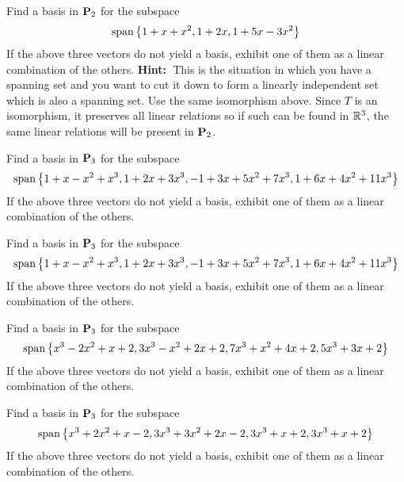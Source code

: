 \begin{ex}
  Find a basis in $\mathbf{P}_{2}$ for the subspace
  \begin{equation*}
    \sspan\set{1+x+x^{2},1+2x,1+5x-3x^{2}}
  \end{equation*}
  If the above three vectors do not yield a basis, exhibit one of them
  as a linear combination of the others. \textbf{Hint:\ }This is the
  situation in which you have a spanning set and you want to cut it
  down to form a linearly independent set which is also a spanning
  set. Use the same isomorphism above. Since $T$ is an isomorphism, it
  preserves all linear relations so if such can be found in $\mathbb{R}^{3}$,
  the same linear relations will be present in $\mathbf{P}_{2}$.
\end{ex}

\begin{ex}
  Find a basis in $\mathbf{P}_{3}$ for the subspace
  \begin{equation*}
    \sspan\set{
      1+x-x^{2}+x^{3},1+2x+3x^{3},-1+3x+5x^{2}+7x^{3},1+6x+4x^{2}+11x^{3}}
  \end{equation*}
  If the above three vectors do not yield a basis, exhibit one of them
  as a linear combination of the others.
\end{ex}

\begin{ex}
  Find a basis in $\mathbf{P}_{3}$ for the subspace
  \begin{equation*}
    \sspan\set{
      1+x-x^{2}+x^{3},1+2x+3x^{3},-1+3x+5x^{2}+7x^{3},1+6x+4x^{2}+11x^{3}}
  \end{equation*}
  If the above three vectors do not yield a basis, exhibit one of them
  as a linear combination of the others.
\end{ex}

\begin{ex}
  Find a basis in $\mathbf{P}_{3}$ for the subspace
  \begin{equation*}
    \sspan\set{
      x^{3}-2x^{2}+x+2,3x^{3}-x^{2}+2x+2,7x^{3}+x^{2}+4x+2,5x^{3}+3x+2}
  \end{equation*}
  If the above three vectors do not yield a basis, exhibit one of them
  as a linear combination of the others.
\end{ex}

\begin{ex}
  Find a basis in $\mathbf{P}_{3}$ for the subspace
  \begin{equation*}
    \sspan\set{
      x^{3}+2x^{2}+x-2,3x^{3}+3x^{2}+2x-2,3x^{3}+x+2,3x^{3}+x+2}
  \end{equation*}
  If the above three vectors do not yield a basis, exhibit one of them
  as a linear combination of the others.
\end{ex}

